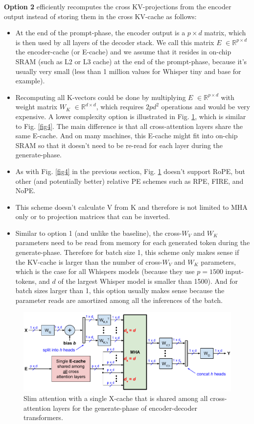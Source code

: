 \documentclass{article}
\newcommand{\eR}[2]{$\in \mathbb{R}^{#1 \times #2}$} %
\begin{document}
\textbf{Option 2} efficiently recomputes the cross KV-projections from the encoder output instead of storing them in the cross KV-cache as follows:
\begin{itemize}[topsep=-1pt, itemsep=-1pt]
  \item At the end of the prompt-phase, the encoder output is a $p \times d$ matrix, which is then used by all layers of the decoder stack. We call this matrix $E$ \eR{p}{d} the encoder-cache (or E-cache) and we assume that it resides in on-chip SRAM (such as L2 or L3 cache) at the end of the prompt-phase, because it’s usually very small (less than 1 million values for Whisper tiny and base for example).
  \item Recomputing all K-vectors could be done by multiplying $E$ \eR{p}{d} with weight matrix $W_K$ \eR{d}{d}, which requires $2 p d^2$ operations and would be very expensive. A lower complexity option is illustrated in Fig. \ref{fig5}, which is similar to Fig. \ref{fig4}. The main difference is that all cross-attention layers share the same E-cache. And on many machines, this E-cache might fit into on-chip SRAM so that it doesn’t need to be re-read for each layer during the generate-phase.
  \item As with Fig. \ref{fig4} in the previous section, Fig. \ref{fig5} doesn’t support RoPE, but other (and potentially better) relative PE schemes such as RPE, FIRE, and NoPE.
  \item This scheme doesn’t calculate V from K and therefore is not limited to MHA only or to projection matrices that can be inverted.
  \item Similar to option 1 (and unlike the baseline), the cross-$W_V$ and $W_K$ parameters need to be read from memory for each generated token during the generate-phase. Therefore for batch size 1, this scheme only makes sense if the KV-cache is larger than the number of cross-$W_V$ and $W_K$ parameters, which is the case for all Whispers models (because they use $p = 1500$ input-tokens, and $d$ of the largest Whisper model is smaller than 1500). And for batch sizes larger than 1, this option usually makes sense because the parameter reads are amortized among all the inferences of the batch.
\end{itemize}

\begin{figure}[h!] \centering
  \includegraphics[scale=0.88]{../doc/fig/slimAttn_fig5.pdf}
  \caption{Slim attention with a single X-cache that is shared among all cross-attention layers for the generate-phase of encoder-decoder transformers.}
\label{fig5} \end{figure}
\end{document}
